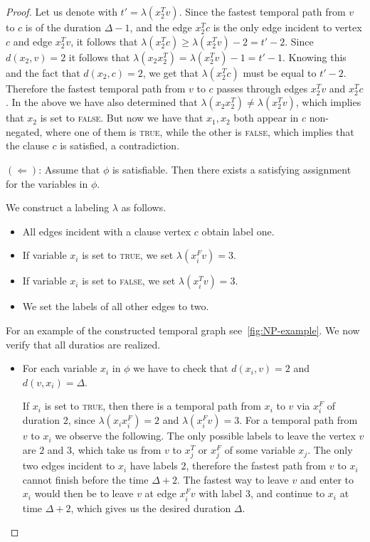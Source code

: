 \documentclass[a4paper,UKenglish,cleveref, autoref, thm-restate]{lipics-v2021}
\begin{document}
\begin{proof}
Let us denote with $t' = \lambda(x_2^T v)$.
Since the fastest temporal path from $v$ to $c$ is of the duration $\Delta - 1$,
and the edge $x_2^T c$ is the only edge incident to vertex $c$ and edge $ x_2^T v$,
it follows that $\lambda(x_2^T c) \geq \lambda(x_2^T v) - 2 = t' - 2$.
Since $d(x_2,v) = 2$ it follows that $\lambda(x_2 x_2^T) = \lambda (x_2^T v) - 1 = t' - 1$.
Knowing this and the fact that $d(x_2,c)=2$, we get that $\lambda(x_2^T c)$ must be equal to $t'-2$.
Therefore the fastest temporal path from $v$ to $c$ passes through edges $ x_2^Tv$ and $x_2^Tc$.
In the above we have also determined that $\lambda(x_2x_2^T) \neq \lambda ( x_2^Tv)$,
which implies that $x_2$ is set to \textsc{false}.
But now we have that $x_1,x_2$ both appear in $c$ non-negated, where one of them is \textsc{true}, while the other is \textsc{false},
which implies that the clause $c$ is satisfied, a contradiction. 



$(\Leftarrow)$: Assume that $\phi$ is satisfiable. Then there exists a satisfying assignment for the variables in $\phi$.

We construct a labeling $\lambda$ as follows.
\begin{itemize}
    \item All edges incident with a clause vertex $c$ obtain label one.
    \item If variable $x_i$ is set to \textsc{true}, we set $\lambda(x_i^F v)=3$.
    \item If variable $x_i$ is set to \textsc{false}, we set $\lambda(x_i^T v)=3$.
    \item We set the labels of all other edges to two.
\end{itemize}
For an example of the constructed temporal graph see~\cref{fig:NP-example}.
We now verify that all duratios are realized.
\begin{itemize}
    \item For each variable $x_i$ in $\phi$ we have to check that $d(x_i,v)=2$
    and $d(v,x_i)=\Delta$. 
    
    If $x_i$ is set to \textsc{true}, then there is a temporal path from $x_i$ to $v$ via 
    $x_i^F$ of duration $2$, since
    $\lambda(x_i x_i^F)=2$ and $\lambda(x_i^F v)=3$.
    For a temporal path from $v$ to $x_i$ we observe the following.
    The only possible labels to leave the vertex $v$ are $2$ and $3$, which take us from $v$ to $x_j^T$ or $x_j^F$ of some variable $x_j$.
    The only two edges incident to $x_i$ have labels $2$, therefore the fastest path from $v$ to $x_i$
    cannot finish before the time $\Delta + 2$.
    The fastest way to leave $v$ and enter to $x_i$ would then be to leave $v$ at edge $x_i^Fv$ with label $3$,
    and continue to $x_i$ at time $\Delta + 2$,
    which gives us the desired duration $\Delta$.
    

\end{itemize}
\end{proof}
\end{document}
